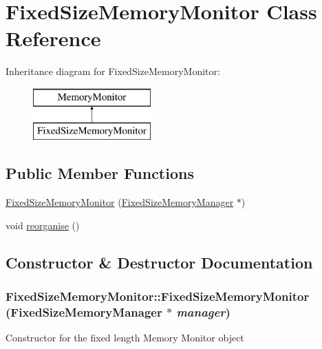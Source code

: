 \hypertarget{classFixedSizeMemoryMonitor}{
\section{FixedSizeMemoryMonitor Class Reference}
\label{classFixedSizeMemoryMonitor}
}
Inheritance diagram for FixedSizeMemoryMonitor:\begin{figure}[H]
\begin{center}
\leavevmode
\includegraphics[height=2cm]{classFixedSizeMemoryMonitor}
\end{center}
\end{figure}
\subsection*{Public Member Functions}
\begin{DoxyCompactItemize}
\item 
\hyperlink{classFixedSizeMemoryMonitor_a9095dbe722006fac79c3ed88892f70c0}{FixedSizeMemoryMonitor} (\hyperlink{classFixedSizeMemoryManager}{FixedSizeMemoryManager} $\ast$)
\item 
void \hyperlink{classFixedSizeMemoryMonitor_aa88727ff9d284f96d626bb006880dd21}{reorganise} ()
\end{DoxyCompactItemize}


\subsection{Constructor \& Destructor Documentation}
\hypertarget{classFixedSizeMemoryMonitor_a9095dbe722006fac79c3ed88892f70c0}{
\subsubsection[{FixedSizeMemoryMonitor}]{\setlength{\rightskip}{0pt plus 5cm}FixedSizeMemoryMonitor::FixedSizeMemoryMonitor ({\bf FixedSizeMemoryManager} $\ast$ {\em manager})}}
\label{classFixedSizeMemoryMonitor_a9095dbe722006fac79c3ed88892f70c0}
Constructor for the fixed length Memory Monitor object


